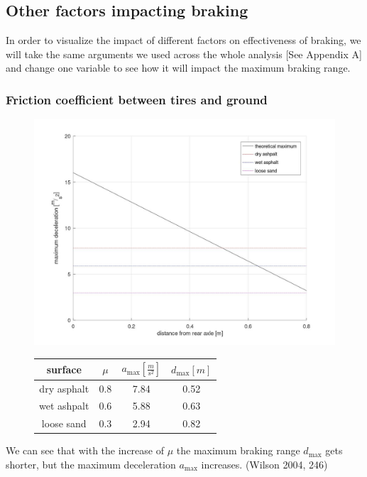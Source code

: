 \documentclass[12pt, a4]{article}
\begin{document}
\subsection{Other factors impacting braking}\label{effective_braking_factors}
In order to visualize the impact of different factors on effectiveness of braking, we will take the same arguments we used across the 
whole analysis [See Appendix A] and change one variable to see how it will impact the maximum braking range.
\subsubsection{Friction coefficient between tires and ground}
\begin{figure}[H]
\begin{minipage}[t]{.6\linewidth}
\vspace{0pt}
\includegraphics[width = \linewidth]{friction_on_braking}
\end{minipage}%
\begin{minipage}[t]{0.4\linewidth}
\vspace{0pt}
\centering
\begin{tabular}{|c | c | c | c|} 
\hline
surface & $\mu$ & $a_{\max} [\frac{m}{s^2}]$ & $d_{\max}[m]$ \\ [0.5ex] 
\hline\hline
dry asphalt & 0.8 & 7.84 & 0.52 \\ [1ex] 
wet ashpalt & 0.6 & 5.88 & 0.63 \\ [1ex]
loose sand & 0.3 & 2.94 & 0.82 \\ [1ex]
\hline
\end{tabular}
\end{minipage}%
\caption{}%
\label{friction_on_braking}
\end{figure}
We can see that with the increase of $\mu$ the maximum braking range $d_{\max}$ gets shorter, but the maximum deceleration $a_{\max}$ 
increases. (Wilson 2004, 246)
\end{document}
